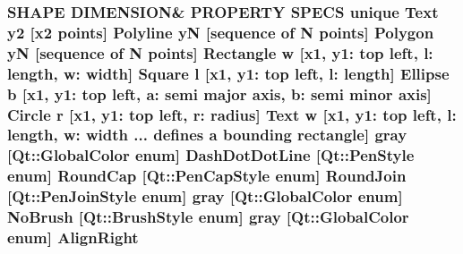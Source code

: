 \subsubsection[{\texorpdfstring{Align\+Right}{AlignRight}}]{\setlength{\rightskip}{0pt plus 5cm}S\+H\+A\+PE D\+I\+M\+E\+N\+S\+I\+ON\& P\+R\+O\+P\+E\+R\+TY S\+P\+E\+CS unique {\bf Text} {\bf y2} \mbox{[}{\bf x2} points\mbox{]} {\bf Polyline} yN \mbox{[}sequence of N points\mbox{]} {\bf Polygon} yN \mbox{[}sequence of N points\mbox{]} {\bf Rectangle} w \mbox{[}{\bf x1}, y1\+: top left, l\+: length, w\+: width\mbox{]} {\bf Square} {\bf l} \mbox{[}{\bf x1}, y1\+: top left, l\+: length\mbox{]} {\bf Ellipse} b \mbox{[}{\bf x1}, y1\+: top left, a\+: semi major axis, b\+: semi minor axis\mbox{]} {\bf Circle} r \mbox{[}{\bf x1}, y1\+: top left, r\+: radius\mbox{]} {\bf Text} w \mbox{[}{\bf x1}, y1\+: top left, l\+: length, w\+: width ... defines {\bf a} bounding rectangle\mbox{]} gray \mbox{[}Qt\+::\+Global\+Color enum\mbox{]} Dash\+Dot\+Dot\+Line \mbox{[}Qt\+::\+Pen\+Style enum\mbox{]} Round\+Cap \mbox{[}{\bf Qt\+::\+Pen\+Cap\+Style} enum\mbox{]} Round\+Join \mbox{[}{\bf Qt\+::\+Pen\+Join\+Style} enum\mbox{]} gray \mbox{[}Qt\+::\+Global\+Color enum\mbox{]} No\+Brush \mbox{[}{\bf Qt\+::\+Brush\+Style} enum\mbox{]} gray \mbox{[}Qt\+::\+Global\+Color enum\mbox{]} Align\+Right}\hypertarget{shape__input__file__specs_8txt_aafd721ba2c64294fd06ac546c7addf5e}{}\label{shape__input__file__specs_8txt_aafd721ba2c64294fd06ac546c7addf5e}
